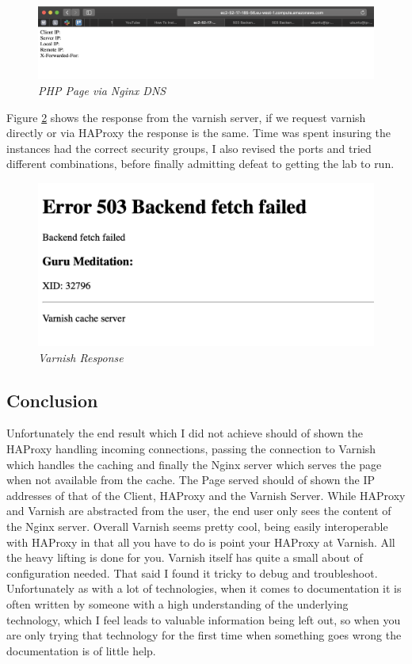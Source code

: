 \begin{figure}[!ht]
\centering
\includegraphics*[width=1\textwidth]{images/h94.png}
\caption{\em PHP Page via Nginx DNS}
\label{img:h94}
\end{figure}

Figure \ref{img:h92} shows the response from the varnish server, if we request varnish directly or via HAProxy the response is the same. Time was spent insuring the instances had the correct security groups, I also revised the ports and tried different combinations, before finally admitting defeat to getting the lab to run.
\begin{figure}[!ht]
\centering
\includegraphics*[width=1\textwidth]{images/h92.png}
\caption{\em Varnish Response}
\label{img:h92}
\end{figure}

\subsection{Conclusion}
Unfortunately the end result which I did not achieve should of shown the HAProxy handling incoming connections, passing the connection to Varnish which handles the caching and finally the Nginx server which serves the page when not available from the cache. The Page served should of shown the IP addresses of that of the Client, HAProxy and the Varnish Server. While HAProxy and Varnish are abstracted from the user, the end user only sees the content of the Nginx server.
Overall Varnish seems pretty cool, being easily interoperable with HAProxy in that all you have to do is point your HAProxy at Varnish. All the heavy lifting is done for you. Varnish itself has quite a small about of configuration needed. That said I found it tricky to debug and troubleshoot. Unfortunately as with a lot of technologies, when it comes to documentation it is often written by someone with a high understanding of the underlying technology, which I feel leads to valuable information being left out, so when you are only trying that technology for the first time when something goes wrong the documentation is of little help.

